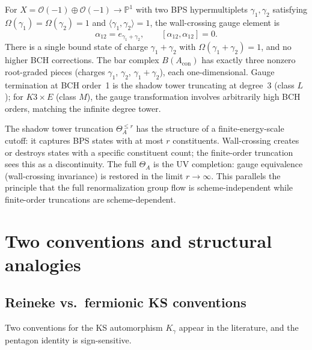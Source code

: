 \begin{example}
\label{ex:phys-conifold-gauge}
For $X = \mathcal{O}(-1) \oplus \mathcal{O}(-1) \to \mathbb{P}^1$ with two BPS hypermultiplets $\gamma_1, \gamma_2$ satisfying $\Omega(\gamma_1) = \Omega(\gamma_2) = 1$ and $\langle \gamma_1, \gamma_2 \rangle = 1$, the wall-crossing gauge element is
\[
\alpha_{12} = e_{\gamma_1 + \gamma_2}, \qquad [\alpha_{12}, \alpha_{12}] = 0.
\]
There is a single bound state of charge $\gamma_1 + \gamma_2$ with $\Omega(\gamma_1 + \gamma_2) = 1$, and no higher BCH corrections. The bar complex $B(A_{\mathrm{con}})$ has exactly three nonzero root-graded pieces (charges $\gamma_1$, $\gamma_2$, $\gamma_1 + \gamma_2$), each one-dimensional. Gauge termination at BCH order~1 is the shadow tower truncating at degree~3 (class $L$); for $K3 \times E$ (class $M$), the gauge transformation involves arbitrarily high BCH orders, matching the infinite degree tower.
\end{example}

\begin{remark}
The shadow tower truncation $\Theta^{\leq r}_A$ has the structure of a finite-energy-scale cutoff: it captures BPS states with at most $r$ constituents. Wall-crossing creates or destroys states with a specific constituent count; the finite-order truncation sees this as a discontinuity. The full $\Theta_A$ is the UV completion: gauge equivalence (wall-crossing invariance) is restored in the limit $r \to \infty$. This parallels the principle that the full renormalization group flow is scheme-independent while finite-order truncations are scheme-dependent.
\end{remark}

\section{Two conventions and structural analogies}
\label{sec:phys-wc-conventions-analogies}

\subsection{Reineke vs.\ fermionic KS conventions}
\label{ssec:phys-reineke-fermionic}

Two conventions for the KS automorphism $K_\gamma$ appear in the
literature, and the pentagon identity is sign-sensitive.

